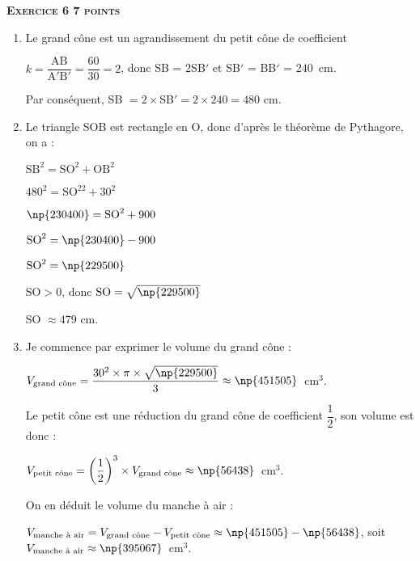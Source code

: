 \textbf{\textsc{Exercice 6 \hfill 7 points}}

\medskip

\begin{enumerate}
\item Le grand cône est un agrandissement du petit cône de coefficient 

$k = \dfrac{\text{AB}}{\text{A}'\text{B}'} = \dfrac{60}{30} = 2$, donc SB = 2SB$'$ et SB$'$ = BB$'$ = 240~cm.

Par conséquent, SB $= 2 \times $SB$' = 2 \times 240 = 480$ cm.
\item  Le triangle SOB est rectangle en O, donc d'après le théorème de Pythagore, on a :

$\text{SB}^2 = \text{SO}^2 + \text{OB}^2$

$480^2 = \text{SO}^22 + 30^2$

$\np{230400} = \text{SO}^2 + 900$

$\text{SO}^2 = \np{230400} - 900$

$\text{SO}^2 = \np{229500}$

$\text{SO} > 0$, donc $\text{SO} = \sqrt{\np{229500}}$

SO $\approx 479$ cm.
\item  Je commence par exprimer le volume du grand cône :

$V_{\text{grand cône}} = \dfrac{30^2 \times  \pi \times \sqrt{\np{229500}}}{3} \approx  \np{451505}$~cm$^3$.

Le petit cône est une réduction du grand cône de coefficient $\dfrac{1}{2}$, son volume est donc :

$V_{\text{petit cône}} = \left(\dfrac{1}{2}\right)^3 \times  V_{\text{grand cône}} \approx \np{56438}$~cm$^3$.

On en déduit le volume du manche à air :

$V_{\text{manche à air}} = V_{\text{grand cône}} - V_{\text{petit cône}} \approx 
\np{451505} - \np{56438}$, soit $V_{\text{manche à air}} \approx \np{395067}$~cm$^3$.
\end{enumerate}

\vspace{0,5cm}


